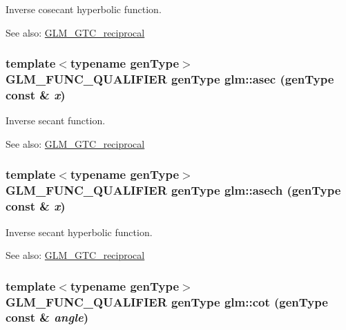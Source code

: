 Inverse cosecant hyperbolic function.

\begin{Desc}
\item[See also:]\hyperlink{group__gtc__reciprocal}{GLM\_\-GTC\_\-reciprocal} \end{Desc}
\hypertarget{group__gtc__reciprocal_g79e2b1e9949a6c514eef05d462ab01a0}{
\subsubsection[asec]{\setlength{\rightskip}{0pt plus 5cm}template$<$typename genType$>$ GLM\_\-FUNC\_\-QUALIFIER genType glm::asec (genType const \& {\em x})}}
\label{group__gtc__reciprocal_g79e2b1e9949a6c514eef05d462ab01a0}


Inverse secant function.

\begin{Desc}
\item[See also:]\hyperlink{group__gtc__reciprocal}{GLM\_\-GTC\_\-reciprocal} \end{Desc}
\hypertarget{group__gtc__reciprocal_g05d1bc30693d02a9a08c9044d75c5333}{
\subsubsection[asech]{\setlength{\rightskip}{0pt plus 5cm}template$<$typename genType$>$ GLM\_\-FUNC\_\-QUALIFIER genType glm::asech (genType const \& {\em x})}}
\label{group__gtc__reciprocal_g05d1bc30693d02a9a08c9044d75c5333}


Inverse secant hyperbolic function.

\begin{Desc}
\item[See also:]\hyperlink{group__gtc__reciprocal}{GLM\_\-GTC\_\-reciprocal} \end{Desc}
\hypertarget{group__gtc__reciprocal_g8d3b73a481ad1115ca93da1410868e10}{
\subsubsection[cot]{\setlength{\rightskip}{0pt plus 5cm}template$<$typename genType$>$ GLM\_\-FUNC\_\-QUALIFIER genType glm::cot (genType const \& {\em angle})}}
\label{group__gtc__reciprocal_g8d3b73a481ad1115ca93da1410868e10}


